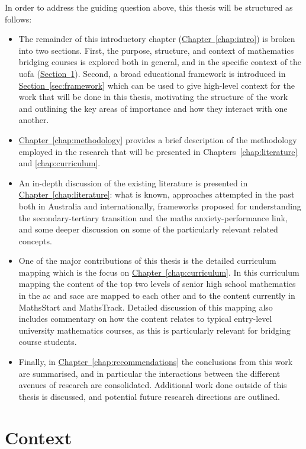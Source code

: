 \documentclass[twoside,12pt,a4paper]{report}
\newcommand{\refchap}[1]{\hyperref[chap:#1]{Chapter~\ref{chap:#1}}}
\newcommand{\refsec}[1]{\hyperref[sec:#1]{Section~\ref{sec:#1}}}
\begin{document}
In order to address the guiding question above, this thesis will be structured as follows:
\begin{itemize}
	\item The remainder of this introductory chapter (\refchap{intro}) is broken into two sections. First, the purpose, structure, and context of mathematics bridging courses is explored both in general, and in the specific context of the \gls{uofa} (\refsec{context}). Second, a broad educational framework is introduced in \refsec{framework} which can be used to give high-level context for the work that will be done in this thesis, motivating the structure of the work and outlining the key areas of importance and how they interact with one another.
	\item \refchap{methodology} provides a brief description of the methodology employed in the research that will be presented in Chapters~\ref{chap:literature} and \ref{chap:curriculum}.
	\item An in-depth discussion of the existing literature is presented in \refchap{literature}: what is known, approaches attempted in the past both in Australia and internationally, frameworks proposed for understanding the secondary-tertiary transition and the maths anxiety-performance link, and some deeper discussion on some of the particularly relevant related concepts.
	\item One of the major contributions of this thesis is the detailed curriculum mapping which is the focus on \refchap{curriculum}. In this curriculum mapping the content of the top two levels of senior high school mathematics in the \gls{ac} and \gls{sace} are mapped to each other and to the content currently in MathsStart and MathsTrack. Detailed discussion of this mapping also includes commentary on how the content relates to typical entry-level university mathematics courses, as this is particularly relevant for bridging course students. 
	\item Finally, in \refchap{recommendations} the conclusions from this work are summarised, and in particular the interactions between the different avenues of research are consolidated. Additional work done outside of this thesis is discussed, and potential future research directions are outlined.
\end{itemize}



\section{Context}
\label{sec:context}
\end{document}
